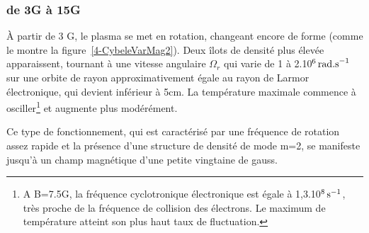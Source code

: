 \begin{refsection}
\subsubsection{de 3G à 15G}
À partir de 3 G, le plasma se met en rotation, changeant encore de forme (comme
le montre la figure~\ref{4-CybeleVarMag2}). Deux îlots de densité plus élevée
apparaissent, tournant à une vitesse angulaire $\Omega_r$ qui varie de 1 à 
2.10$^{{6}}\,\text{rad.s}^{{-1}}$ sur une orbite de rayon
 approximativement égale au rayon de Larmor électronique, qui devient inférieur
à 5cm. La température maximale commence à osciller\footnote{A B=7.5G, la
fréquence cyclotronique électronique est égale à
1,3.10$^{{8}}\,\text{s}^{{-1}}$, très proche de la fréquence de
collision des électrons. Le maximum de température atteint son plus haut taux de fluctuation.} et augmente plus modérément.

Ce type de fonctionnement, qui est caractérisé par une
fréquence de rotation assez rapide et la présence d'une structure de densité de
mode m=2, se manifeste jusqu'à un champ magnétique d'une petite vingtaine de
gauss. 


\end{refsection}
